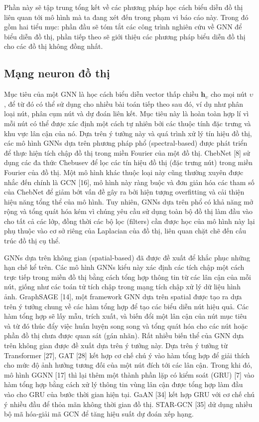 Phần này sẽ tập trung tổng kết về các phương pháp học cách biểu diễn đồ thị liên quan tới mô hình mà ta đang xét đến trong phạm vi báo cáo này. Trong đó gồm hai tiểu mục: phần đầu sẽ tóm tắt các công trình nghiên cứu về GNN để biểu diễn đồ thị, phần tiếp theo sẽ giới thiệu các phương pháp biểu diễn đồ thị cho các đồ thị không đồng nhất.

\subsection{Mạng neuron đồ thị}
Mục tiêu của một GNN là học cách biểu diễn vector thấp chiều $\pmb{h}_{\upsilon}$ cho mọi nút $\upsilon$, để từ đó có thể sử dụng cho nhiều bài toán tiếp theo sau đó, ví dụ như phân loại nút, phân cụm nút và dự đoán liên kết. Mục tiêu này là hoàn toàn hợp lí vì mỗi nút có thể được xác định một cách tự nhiên bởi các thuộc tính đặc trưng và khu vực lân cận của nó. Dựa trên ý tưởng này và quá trình xử lý tín hiệu đồ thị, các mô hình GNNs dựa trên phương pháp phổ (spectral-based) được phát triển để thực hiện tích chập đồ thị trong miền Fourier của một đồ thị. ChebNet [8] sử dụng các đa thức Chebusev để lọc các tín hiệu đồ thị (đặc trưng nút) trong miền Fourier của đồ thị. Một mô hình khác thuộc loại này cũng thường xuyên được nhắc đến chính là GCN [16], mô hình này ràng buộc và đơn giản hóa các tham số của ChebNet để giảm bớt vấn đề gây ra bởi hiện tượng overfitting và cải thiện hiệu năng tổng thể của mô hình. Tuy nhiên, GNNs dựa trên phổ có khả năng mở rộng và tổng quát hóa kém vì chúng yêu cầu sử dụng toàn bộ đồ thị làm đầu vào cho tất cả các lớp, đồng thời các bộ lọc (filters) cần được học của mô hình này lại phụ thuộc vào cơ sở riêng của Laplacian của đồ thị, liên quan chặt chẽ đến cấu trúc đồ thị cụ thể.

GNNs dựa trên không gian (spatial-based) đã được đề xuất để khắc phục những hạn chế kể trên. Các mô hình GNNs kiểu này xác định các tích chập một cách trực tiếp trong miền đồ thị bằng cách tổng hợp thông tin từ các lân cận của mỗi nút, giống như các toán tử tích chập trong mạng tích chập xử lý dữ liệu hình ảnh. GraphSAGE [14], một framework GNN dựa trên spatial được tạo ra dựa trên ý tưởng chung về các hàm tổng hợp để tạo các biểu diễn nút hiệu quả. Các hàm tổng hợp sẽ lấy mẫu, trích xuất, và biến đổi một lân cận của nút mục tiêu và từ đó thúc đẩy việc huấn luyện song song và tổng quát hóa cho các nút hoặc phần đồ thị chưa được quan sát (gán nhãn). Rất nhiều biến thể của GNN dựa trên không gian được đề xuất dựa trên ý tưởng này. Dựa trên ý tưởng từ Transformer [27], GAT [28] kết hợp cơ chế chú ý vào hàm tổng hợp để giải thích cho mức độ ảnh hưởng tương đối của một nút đích tới các lân cận. Trong khi đó, mô hình GGNN [17] thì lại thêm một thành phần lặp có kiểm soát (GRU) [7] vào hàm tổng hợp bằng cách xử lý thông tin vùng lân cận được tổng hợp làm đầu vào cho GRU của bước thời gian hiện tại. GaAN [34] kết hợp GRU với cơ chế chú ý nhiều đầu để thỏa mãn không thời gian đồ thị. STAR-GCN [35] dử dụng nhiều bộ mã hóa-giải mã GCN để tăng hiệu suất dự đoán xếp hạng. 

